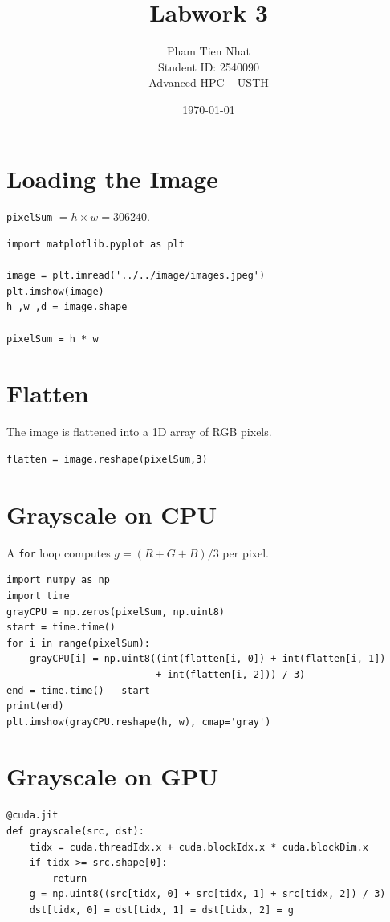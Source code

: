 \documentclass[11pt,a4paper]{article}
\title{Labwork 3}
\author{Pham Tien Nhat \\ Student ID: 2540090 \\ Advanced HPC -- USTH}
\date{\today}
\begin{document}
\maketitle

\section{Loading the Image}
\texttt{pixelSum} $= h \times w = 306240$.

\begin{verbatim}
import matplotlib.pyplot as plt

image = plt.imread('../../image/images.jpeg')
plt.imshow(image)
h ,w ,d = image.shape

pixelSum = h * w
\end{verbatim}

\section{Flatten}
The image is flattened into a 1D array of RGB pixels.

\begin{verbatim}
flatten = image.reshape(pixelSum,3)
\end{verbatim}

\section{Grayscale on CPU}
A \texttt{for} loop computes $g = (R+G+B)/3$ per pixel.

\begin{verbatim}
import numpy as np
import time 
grayCPU = np.zeros(pixelSum, np.uint8)
start = time.time()
for i in range(pixelSum):
    grayCPU[i] = np.uint8((int(flatten[i, 0]) + int(flatten[i, 1])
                          + int(flatten[i, 2])) / 3)
end = time.time() - start
print(end)
plt.imshow(grayCPU.reshape(h, w), cmap='gray')
\end{verbatim}

\section{Grayscale on GPU}

\begin{verbatim}
@cuda.jit
def grayscale(src, dst):
    tidx = cuda.threadIdx.x + cuda.blockIdx.x * cuda.blockDim.x
    if tidx >= src.shape[0]:
        return
    g = np.uint8((src[tidx, 0] + src[tidx, 1] + src[tidx, 2]) / 3)
    dst[tidx, 0] = dst[tidx, 1] = dst[tidx, 2] = g
\end{verbatim}
\end{document}
